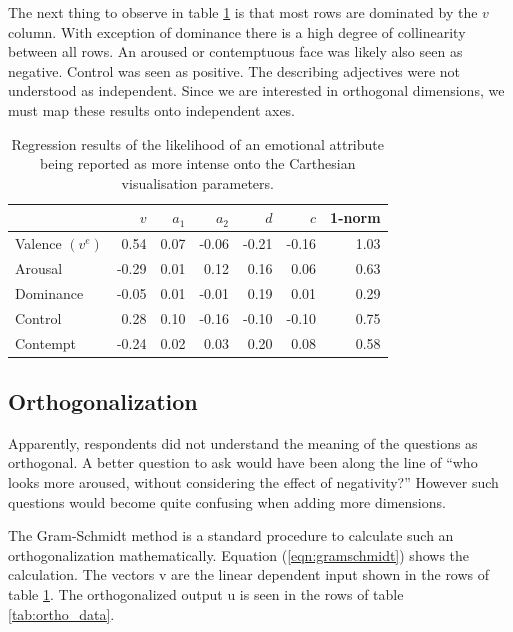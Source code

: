 The next thing to observe in table \ref{tab:raw_data} is that most rows are dominated by the $v$ column.
With exception of dominance
there is a high degree of collinearity between all rows. An aroused or contemptuous face was
likely also seen as negative. Control was
seen as positive. The describing adjectives were not understood as independent.
Since we are interested in orthogonal dimensions, we must map these results onto independent axes.

\begin{table}[ht!]
  \begin{center}
    \begin{tabular}{lrrrrrr}
      {} &     $v$ &     $a_1$ &     $a_2$ &     $d$ &     $c$ &  1-norm \\
      \midrule
      Valence $(v^e)$   &  0.54 & 0.07 & -0.06 & -0.21 & -0.16 & 1.03 \\
      Arousal           & -0.29 & 0.01 &  0.12 &  0.16 &  0.06 & 0.63 \\
      Dominance         & -0.05 & 0.01 & -0.01 &  0.19 &  0.01 & 0.29 \\
      Control           &  0.28 & 0.10 & -0.16 & -0.10 & -0.10 & 0.75 \\
      Contempt          & -0.24 & 0.02 &  0.03 &  0.20 &  0.08 & 0.58 \\
      \midrule
    \end{tabular}
  \end{center}
  \caption{Regression results of the likelihood of an emotional attribute being reported as more intense onto the Carthesian visualisation parameters.}
  \label{tab:raw_data}
\end{table}

\subsection{Orthogonalization}

Apparently, respondents did not understand the meaning of the questions as orthogonal.
A better question to ask would have been along the line of “who looks more aroused,
without considering the effect of negativity?” However such questions would become quite
confusing when adding more dimensions.

The Gram-Schmidt method is a standard procedure to calculate such an orthogonalization mathematically.
Equation (\ref{eqn:gramschmidt}) shows the calculation. The vectors v are the linear dependent
input shown in the rows of table \ref{tab:raw_data}. The orthogonalized output u is seen in the rows
of table \ref{tab:ortho_data}.

